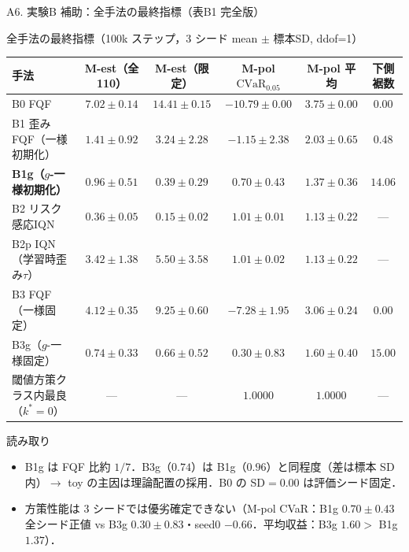 \documentclass[aspectratio=169, 10pt]{beamer}
\DeclareMathOperator{\CVaR}{CVaR}
\begin{document}
\begin{frame}{A6. 実験B 補助：全手法の最終指標（表B1 完全版）}
  \begin{block}{全手法の最終指標（100k ステップ，3 シード mean $\pm$ 標本SD, ddof=1）}
    \centering
    \tiny
    \setlength{\tabcolsep}{2.5pt}
    \begin{tabular}{@{}lccccc@{}}
      \toprule
      手法 & M-est（全110） & M-est（限定） & M-pol $\CVaR_{0.05}$ & M-pol 平均 & 下側裾数 \\
      \midrule
      B0 FQF & $7.02\pm0.14$ & $14.41\pm0.15$ & $-10.79\pm0.00$ & $3.75\pm0.00$ & $0.00$ \\
      B1 歪みFQF（一様初期化） & $1.41\pm0.92$ & $3.24\pm2.28$ & $-1.15\pm2.38$ & $2.03\pm0.65$ & $0.48$ \\
      \textbf{B1g（$g$-一様初期化）} & $\mathbf{0.96\pm0.51}$ & $\mathbf{0.39\pm0.29}$ & $\mathbf{0.70\pm0.43}$ & $1.37\pm0.36$ & $\mathbf{14.06}$ \\
      B2 リスク感応IQN & $\mathbf{0.36\pm0.05}$ & $\mathbf{0.15\pm0.02}$ & $1.01\pm0.01$ & $1.13\pm0.22$ & --- \\
      B2p IQN（学習時歪み$\tau$） & $3.42\pm1.38$ & $5.50\pm3.58$ & $1.01\pm0.02$ & $1.13\pm0.22$ & --- \\
      B3 FQF（一様固定） & $4.12\pm0.35$ & $9.25\pm0.60$ & $-7.28\pm1.95$ & $3.06\pm0.24$ & $0.00$ \\
      B3g（$g$-一様固定） & $0.74\pm0.33$ & $0.66\pm0.52$ & $0.30\pm0.83$ & $1.60\pm0.40$ & $15.00$ \\
      \midrule
      閾値方策クラス内最良（$k^*=0$） & --- & --- & $1.0000$ & $1.0000$ & --- \\
      \bottomrule
    \end{tabular}
  \end{block}
  \begin{exampleblock}{読み取り}
    \tiny
    \begin{itemize}
      \item B1g は FQF 比約 $1/7$．B3g（$0.74$）は B1g（$0.96$）と同程度（差は標本 SD 内）$\to$ toy の主因は理論配置の採用．B0 の SD$=0.00$ は評価シード固定．
      \item 方策性能は 3 シードでは優劣確定できない（M-pol CVaR：B1g $0.70\pm0.43$ 全シード正値 vs B3g $0.30\pm0.83$・seed0 $-0.66$．平均収益：B3g $1.60>$ B1g $1.37$）．
    \end{itemize}
  \end{exampleblock}
\end{frame}
\end{document}
